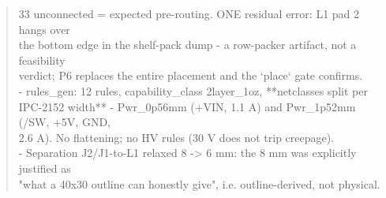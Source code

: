 \documentclass[11pt,a4paper]{article}
\begin{document}
\begin{quote}
  33 unconnected = expected pre-routing. ONE residual error: L1 pad 2 hangs over\\
  the bottom edge in the shelf-pack dump - a row-packer artifact, not a feasibility\\
  verdict; P6 replaces the entire placement and the `place` gate confirms.\\
- rules\_gen: 12 rules, capability\_class 2layer\_1oz, {*}{*}netclasses split per\\
  IPC-2152 width{*}{*} - Pwr\_0p56mm (+VIN, 1.1 A) and Pwr\_1p52mm (/SW, +5V, GND,\\
  2.6 A). No flattening; no HV rules (30 V does not trip creepage).\\
- Separation J2/J1-to-L1 relaxed 8 -\textgreater{} 6 mm: the 8 mm was explicitly justified as\\
  "what a 40x30 outline can honestly give", i.e. outline-derived, not physical.
\end{quote}
\end{document}
